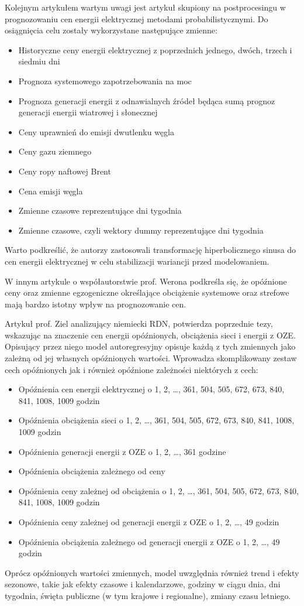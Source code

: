 Kolejnym artykułem wartym uwagi jest artykuł skupiony na postprocesingu \cite{LIPIECKI2024107934} w prognozowaniu cen energii elektrycznej metodami probabilistycznymi. Do osiągnięcia celu zostały wykorzystane następujące zmienne: 
\begin{itemize}
    \item Historyczne ceny energii elektrycznej z poprzednich jednego, dwóch, trzech i siedmiu dni
    \item Prognoza systemowego zapotrzebowania na moc
    \item Prognoza generacji energii z odnawialnych źródeł będąca sumą prognoz generacji energii wiatrowej i słonecznej
    \item Ceny uprawnień do emisji dwutlenku węgla
    \item Ceny gazu ziemnego
    \item Ceny ropy naftowej Brent
    \item Cena emisji węgla
    \item Zmienne czasowe reprezentujące dni tygodnia
    \item Zmienne czasowe, czyli wektory dummy reprezentujące dni tygodnia
\end{itemize}
Warto podkreślić, że autorzy zastosowali transformację hiperbolicznego sinusa do cen energii elektrycznej w celu stabilizacji wariancji przed modelowaniem.

W innym artykule o współautorstwie prof. Werona \cite{en9080621} podkreśla się, że opóźnione ceny oraz zmienne egzogeniczne określające obciążenie systemowe oraz strefowe mają bardzo istotny wpływ na prognozowanie cen.

Artykuł prof. Ziel \cite{ZIEL201598} analizujący niemiecki RDN, potwierdza poprzednie tezy, wskazując na znaczenie cen energii opóźnionych, obciążenia sieci i energii z OZE. Opisujący przez niego model autoregresyjny opisuje każdą z tych zmiennych jako zależną od jej własnych opóźnionych wartości. Wprowadza skomplikowany zestaw cech opóźnionych jak i również opóźnione zależności niektórych z cech:
\begin{itemize}
    \item Opóźnienia cen energii elektrycznej o 1, 2, …, 361, 504, 505, 672, 673, 840, 841, 1008, 1009 godzin
    \item Opóźnienia obciążenia sieci o 1, 2, …, 361, 504, 505, 672, 673, 840, 841, 1008, 1009 godzin
    \item Opóźnienia generacji energii z OZE o 1, 2, …, 361 godzine
    \item Opóźnienia obciążenia zależnego od ceny
    \item Opóźnienia ceny zależnej od obciążenia o 1, 2, …, 361, 504, 505, 672, 673, 840, 841, 1008, 1009 godzin
    \item Opóźnienia ceny zależnej od generacji energii z OZE o 1, 2, …, 49 godzin
    \item Opóźnienia obciążenia zależnego od generacji energii z OZE o 1, 2, …, 49 godzin
\end{itemize}
Oprócz opóźnionych wartości zmiennych, model uwzględnia również trend i efekty sezonowe, takie jak efekty czasowe i kalendarzowe, godziny w ciągu dnia, dni tygodnia, święta publiczne (w tym krajowe i regionalne), zmiany czasu letniego.

